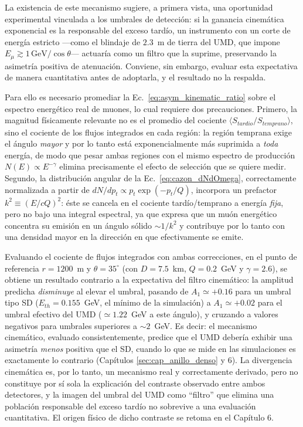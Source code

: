 La existencia de este mecanismo sugiere, a primera vista, una oportunidad experimental vinculada a los umbrales de detección: si la ganancia cinemática exponencial es la responsable del exceso tardío, un instrumento con un corte de energía estricto —como el blindaje de $2.3$~m de tierra del UMD, que impone $E_\mu \gtrsim 1\,\mathrm{GeV}/\cos\theta$— actuaría como un filtro que la suprime, preservando la asimetría positiva de atenuación. Conviene, sin embargo, evaluar esta expectativa de manera cuantitativa antes de adoptarla, y el resultado no la respalda.

Para ello es necesario promediar la Ec.~\ref{eq:asym_kinematic_ratio} sobre el espectro energético real de muones, lo cual requiere dos precauciones. Primero, la magnitud físicamente relevante no es el promedio del cociente $\langle S_{tardio}/S_{temprano}\rangle$, sino el cociente de los flujos integrados en cada región: la región temprana exige el ángulo \textit{mayor} y por lo tanto está exponencialmente más suprimida a \textit{toda} energía, de modo que pesar ambas regiones con el mismo espectro de producción $N(E)\propto E^{-\gamma}$ elimina precisamente el efecto de selección que se quiere medir. Segundo, la distribución angular de la Ec.~\ref{eq:cazon_dNdOmega}, correctamente normalizada a partir de $dN/dp_t \propto p_t\exp(-p_t/Q)$, incorpora un prefactor $k^2 \equiv (E/cQ)^2$: éste se cancela en el cociente tardío/temprano a energía \textit{fija}, pero no bajo una integral espectral, ya que expresa que un muón energético concentra su emisión en un ángulo sólido $\sim 1/k^2$ y contribuye por lo tanto con una densidad mayor en la dirección en que efectivamente se emite.

Evaluando el cociente de flujos integrados con ambas correcciones, en el punto de referencia $r = 1200$~m y $\theta = 35^\circ$ (con $D = 7.5$~km, $Q = 0.2$~GeV y $\gamma = 2.6$), se obtiene un resultado contrario a la expectativa del filtro cinemático: la amplitud predicha \textit{disminuye} al elevar el umbral, pasando de $A_1 \simeq +0.16$ para un umbral tipo SD ($E_{th} = 0.155$~GeV, el mínimo de la simulación) a $A_1 \simeq +0.02$ para el umbral efectivo del UMD ($\simeq 1.22$~GeV a este ángulo), y cruzando a valores negativos para umbrales superiores a $\sim 2$~GeV. Es decir: el mecanismo cinemático, evaluado consistentemente, predice que el UMD debería exhibir una asimetría \textit{menos} positiva que el SD, cuando lo que se mide en las simulaciones es exactamente lo contrario (Capítulos \ref{sec:cap_anillo_denso} y 6). La divergencia cinemática es, por lo tanto, un mecanismo real y correctamente derivado, pero no constituye por sí sola la explicación del contraste observado entre ambos detectores, y la imagen del umbral del UMD como ``filtro'' que elimina una población responsable del exceso tardío no sobrevive a una evaluación cuantitativa. El origen físico de dicho contraste se retoma en el Capítulo 6.

